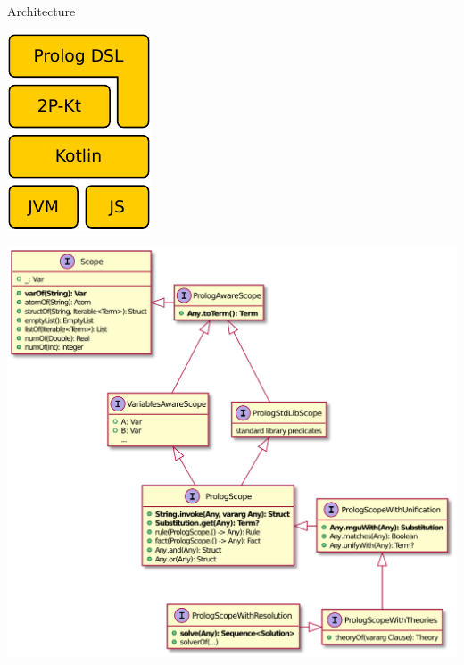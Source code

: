 \documentclass[handout]{beamer}
\begin{document}
\begin{frame}[allowframebreaks]{Architecture}

    \begin{center}
        \includegraphics[width=0.3\linewidth]{img/dsl-layers.pdf}
    \end{center}

    \framebreak
    
    \begin{center}
        \includegraphics[width=0.50\linewidth]{img/dsl-core.pdf}
    \end{center}

    \framebreak


\end{frame}
\end{document}
